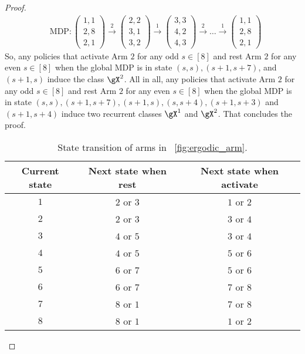 \begin{proof}
\begin{align*}
        &\text{MDP} : \begin{pmatrix}1,1\\2,8\\2,1\end{pmatrix} \overset{2}{\to} \begin{pmatrix}2,2\\3,1\\3,2\end{pmatrix} \overset{1}{\to} \begin{pmatrix}3,3\\4,2\\4,3\end{pmatrix} \overset{2}{\to} \dots \overset{1}{\to} \begin{pmatrix}1,1\\2,8\\2,1\end{pmatrix}
    \end{align*}
    So, any policies that activate Arm $2$ for any odd $s\in[8]$ and rest Arm $2$ for any even $s\in[8]$ when the global MDP is in state $(s,s), (s+1,s+7)$, and $(s+1,s)$ induce the class $\gX^2$.
    All in all, any policies that activate Arm $2$ for any odd $s\in[8]$ and rest Arm $2$ for any even $s\in[8]$ when the global MDP is in state $(s,s), (s+1,s+7), (s+1,s), (s,s+4), (s+1,s+3)$ and $(s+1,s+4)$ induce two recurrent classes $\gX^1$ and $\gX^2$.
    That concludes the proof.
    \begin{table}[ht]
        \centering
        \begin{tabular}{|c|c|c|}
            \hline
            Current state & Next state when rest & Next state when activate \\\hline 
            $1$   & $2$ or $3$  &  $1$ or $2$ \\
            $2$   & $2$ or $3$  &  $3$ or $4$ \\
            $3$   & $4$ or $5$  &  $3$ or $4$ \\
            $4$   & $4$ or $5$  &  $5$ or $6$ \\
            $5$   & $6$ or $7$  &  $5$ or $6$ \\
            $6$   & $6$ or $7$  &  $7$ or $8$ \\
            $7$   & $8$ or $1$  &  $7$ or $8$ \\
            $8$   & $8$ or $1$  &  $1$ or $2$ \\ \hline
        \end{tabular}
        \caption{State transition of arms in \figurename~\ref{fig:ergodic_arm}.}

\end{table}
\end{proof}

